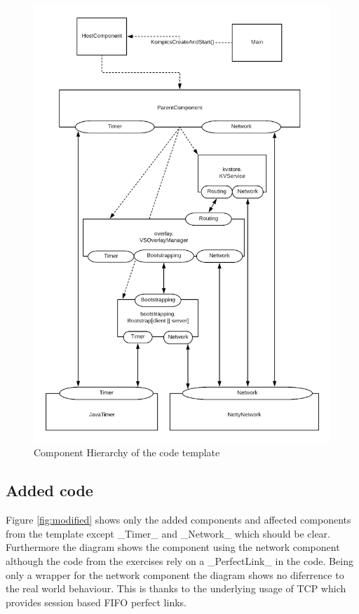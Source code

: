 \documentclass[a4paper]{scrartcl}
\begin{document}
\begin{figure}[h!]
  \begin{center}
    \includegraphics[scale=0.4]{Initial.png}
    \caption{Component Hierarchy of the code template}
    \label{fig:initial}
  \end{center}
\end{figure}

\subsection{Added code}
Figure \ref{fig:modified} shows only the added components and affected components from the template except _Timer_ and _Network_ which should be clear.
Furthermore the diagram shows the component using the network component although the code from the exercises rely on a _PerfectLink_ in the code. 
Being only a wrapper  for the network component the diagram shows no diferrence to the real world behaviour.
This is thanks to the underlying usage of TCP which provides session based FIFO perfect links.
\end{document}
